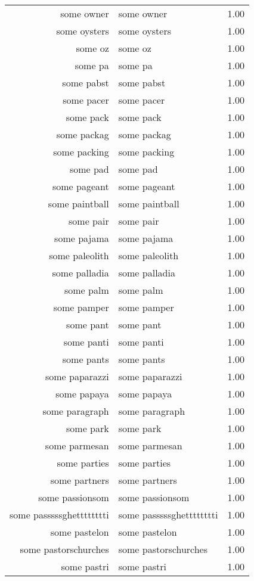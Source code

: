 \begin{table}[ht]
\begin{tabular}{rlr}
  some owner & some owner & 1.00 \\ 
  some oysters & some oysters & 1.00 \\ 
  some oz & some oz & 1.00 \\ 
  some pa & some pa & 1.00 \\ 
  some pabst & some pabst & 1.00 \\ 
  some pacer & some pacer & 1.00 \\ 
  some pack & some pack & 1.00 \\ 
  some packag & some packag & 1.00 \\ 
  some packing & some packing & 1.00 \\ 
  some pad & some pad & 1.00 \\ 
  some pageant & some pageant & 1.00 \\ 
  some paintball & some paintball & 1.00 \\ 
  some pair & some pair & 1.00 \\ 
  some pajama & some pajama & 1.00 \\ 
  some paleolith & some paleolith & 1.00 \\ 
  some palladia & some palladia & 1.00 \\ 
  some palm & some palm & 1.00 \\ 
  some pamper & some pamper & 1.00 \\ 
  some pant & some pant & 1.00 \\ 
  some panti & some panti & 1.00 \\ 
  some pants & some pants & 1.00 \\ 
  some paparazzi & some paparazzi & 1.00 \\ 
  some papaya & some papaya & 1.00 \\ 
  some paragraph & some paragraph & 1.00 \\ 
  some park & some park & 1.00 \\ 
  some parmesan & some parmesan & 1.00 \\ 
  some parties & some parties & 1.00 \\ 
  some partners & some partners & 1.00 \\ 
  some passionsom & some passionsom & 1.00 \\ 
  some passsssghetttttttti & some passsssghetttttttti & 1.00 \\ 
  some pastelon & some pastelon & 1.00 \\ 
  some pastorschurches & some pastorschurches & 1.00 \\ 
  some pastri & some pastri & 1.00 \\ 

\end{tabular}
\end{table}
